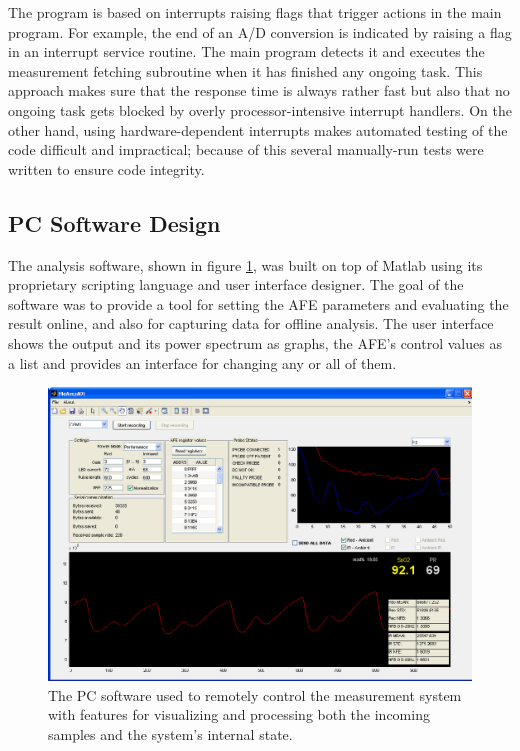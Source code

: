 The program is based on interrupts raising flags that trigger actions in the main program. For example, the end of an A/D conversion is indicated by raising a flag in an interrupt service routine. The main program detects it and executes the measurement fetching subroutine when it has finished any ongoing task. This approach makes sure that the response time is always rather fast but also that no ongoing task gets blocked by overly processor-intensive interrupt handlers. On the other hand, using hardware-dependent interrupts makes automated testing of the code difficult and impractical; because of this several manually-run tests were written to ensure code integrity.

\subsection{PC Software Design}

The analysis software, shown in figure \ref{fig:HkiAsspADE}, was built on top of Matlab using its proprietary scripting language and user interface designer. The goal of the software was to provide a tool for setting the AFE parameters and evaluating the result online, and also for capturing data for offline analysis. The user interface shows the output and its power spectrum as graphs, the AFE's control values as a list and provides an interface for changing any or all of them. 

\begin{figure}[htcb]
\begin{center}
  \includegraphics{kuvat/HkiAsspAde.eps}
  \caption{The PC software used to remotely control the measurement system with features for visualizing and processing both the incoming samples and the system's internal state.}
  \label{fig:HkiAsspADE}
\end{center}
\end{figure}

